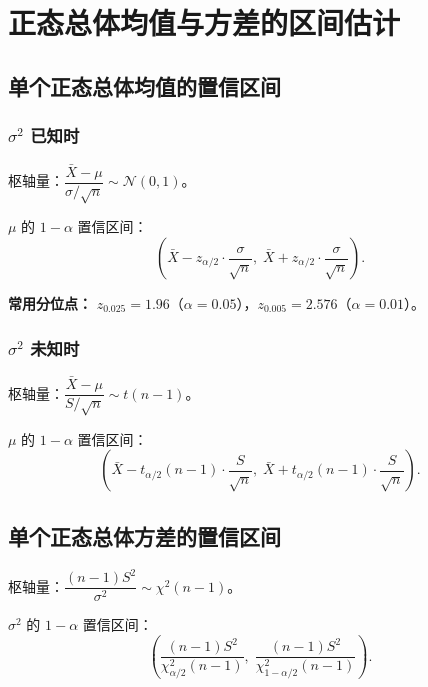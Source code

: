 \section{正态总体均值与方差的区间估计}

\subsection{单个正态总体均值的置信区间}

\subsubsection{$\sigma^2$ 已知时}

枢轴量：$\dfrac{\bar{X} - \mu}{\sigma / \sqrt{n}} \sim \mathcal{N}(0,1)$。

$\mu$ 的 $1-\alpha$ 置信区间：
\begin{equation}
    \boxed{\left(\bar{X} - z_{\alpha/2} \cdot \frac{\sigma}{\sqrt{n}},\;
                 \bar{X} + z_{\alpha/2} \cdot \frac{\sigma}{\sqrt{n}}\right)}.
\end{equation}

\textbf{常用分位点：} $z_{0.025} = 1.96$（$\alpha=0.05$），$z_{0.005} = 2.576$（$\alpha=0.01$）。

\subsubsection{$\sigma^2$ 未知时}

枢轴量：$\dfrac{\bar{X} - \mu}{S / \sqrt{n}} \sim t(n-1)$。

$\mu$ 的 $1-\alpha$ 置信区间：
\begin{equation}
    \boxed{\left(\bar{X} - t_{\alpha/2}(n-1) \cdot \frac{S}{\sqrt{n}},\;
                 \bar{X} + t_{\alpha/2}(n-1) \cdot \frac{S}{\sqrt{n}}\right)}.
\end{equation}

\subsection{单个正态总体方差的置信区间}

枢轴量：$\dfrac{(n-1)S^2}{\sigma^2} \sim \chi^2(n-1)$。

$\sigma^2$ 的 $1-\alpha$ 置信区间：
\begin{equation}
    \boxed{\left(\frac{(n-1)S^2}{\chi^2_{\alpha/2}(n-1)},\;
                 \frac{(n-1)S^2}{\chi^2_{1-\alpha/2}(n-1)}\right)}.
\end{equation}

